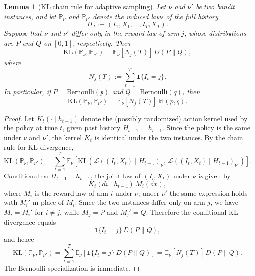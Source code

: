 \documentclass[11pt]{article}
\newtheorem{lemma}{Lemma}
\begin{document}
\begin{lemma}[KL chain rule for adaptive sampling]
\label{lem:kl-chain-rule}
Let $\nu$ and $\nu'$ be two bandit instances, and let $\mathbb P_\nu$ and
$\mathbb P_{\nu'}$ denote the induced laws of the full history
\[
H_T := (I_1,X_1,\dots,I_T,X_T).
\]
Suppose that $\nu$ and $\nu'$ differ only in the reward law of arm $j$, whose
distributions are $P$ and $Q$ on $[0,1]$, respectively. Then
\[
\mathrm{KL}(\mathbb P_\nu,\mathbb P_{\nu'})
=
\mathbb E_\nu[N_j(T)]\,D(P\|Q),
\]
where
\[
N_j(T):=\sum_{t=1}^T \mathbf 1\{I_t=j\}.
\]
In particular, if $P=\mathrm{Bernoulli}(p)$ and
$Q=\mathrm{Bernoulli}(q)$, then
\[
\mathrm{KL}(\mathbb P_\nu,\mathbb P_{\nu'})
=
\mathbb E_\nu[N_j(T)]\,\mathrm{kl}(p,q).
\]
\end{lemma}
\begin{proof}
Let $K_t(\cdot\mid h_{t-1})$ denote the (possibly randomized) action kernel
used by the policy at time $t$, given past history $H_{t-1}=h_{t-1}$.
Since the policy is the same under $\nu$ and $\nu'$, the kernel $K_t$
is identical under the two instances. By the chain rule for KL divergence,
\[
\mathrm{KL}(\mathbb P_\nu,\mathbb P_{\nu'})
=
\sum_{t=1}^T
\mathbb E_\nu\!\left[
\mathrm{KL}\!\left(
\mathcal L((I_t,X_t)\mid H_{t-1})_\nu,\,
\mathcal L((I_t,X_t)\mid H_{t-1})_{\nu'}
\right)\right].
\]
Conditional on $H_{t-1}=h_{t-1}$, the joint law of $(I_t,X_t)$ under $\nu$
is given by
\[
K_t(di\mid h_{t-1})\,M_i(dx),
\]
where $M_i$ is the reward law of arm $i$ under $\nu$; under $\nu'$ the same
expression holds with $M_i'$ in place of $M_i$.
Since the two instances differ only on arm $j$, we have $M_i=M_i'$ for
$i\neq j$, while $M_j=P$ and $M_j'=Q$.
Therefore the conditional KL divergence equals
\[
\mathbf 1\{I_t=j\}\,D(P\|Q),
\]
and hence
\[
\mathrm{KL}(\mathbb P_\nu,\mathbb P_{\nu'})
=
\sum_{t=1}^T
\mathbb E_\nu\!\left[\mathbf 1\{I_t=j\}\,D(P\|Q)\right]
=
\mathbb E_\nu[N_j(T)]\,D(P\|Q).
\]
The Bernoulli specialization is immediate.
\end{proof}
\end{document}
